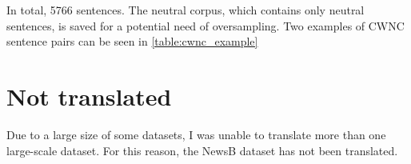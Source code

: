 


In total, 5766 sentences. The neutral corpus, which contains only neutral sentences, is saved for a potential need of oversampling. Two examples of CWNC sentence pairs can be seen in \ref{table:cwnc_example}





\section{Not translated}
Due to a large size of some datasets, I was unable to translate more than one large-scale dataset. For this reason, the NewsB dataset has not been translated.